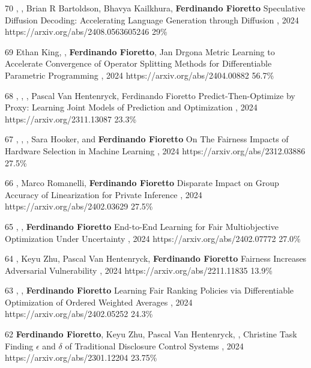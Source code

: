 \begin{pubs}
\confentry
	{70}
	{, , Brian R Bartoldson, Bhavya Kailkhura, {\bf Ferdinando Fioretto}}
	{Speculative Diffusion Decoding: Accelerating Language Generation through Diffusion}
	{, 2024}
	{https://arxiv.org/abs/2408.0563605246}
	{29\%}

\confentry
	{69}
	{Ethan King, , {\bf Ferdinando Fioretto}, Jan Drgona}
	{Metric Learning to Accelerate Convergence of Operator Splitting Methods for Differentiable Parametric Programming}
	{, 2024}
	{https://arxiv.org/abs/2404.00882}
	{56.7\%}

\confentry
	{68}
	{, , , Pascal Van Hentenryck, Ferdinando Fioretto}
	{Predict-Then-Optimize by Proxy: Learning Joint Models of Prediction and Optimization}
  	{\procECAI, 2024}
  	{https://arxiv.org/2311.13087}
  	{23.3\%} %

\confentry
	{67}
	{, , , Sara Hooker, and {\bf Ferdinando Fioretto}}
	{On The Fairness Impacts of Hardware Selection in Machine Learning}	
	{\procICML, 2024}
	{https://arxiv.org/abs/2312.03886}
	{27.5\%}

\confentry
	{66}
	{, Marco Romanelli, {\bf Ferdinando Fioretto}}
	{Disparate Impact on Group Accuracy of Linearization for Private Inference}
	{\procICML, 2024}
	{https://arxiv.org/abs/2402.03629}
	{27.5\%}

\confentry
	{65}
	{, , {\bf Ferdinando Fioretto}}
	{End-to-End Learning for Fair Multiobjective Optimization Under Uncertainty}
	{\procUAI, 2024}
	{https://arxiv.org/abs/2402.07772}
	{27.0\%}

\confentry
	{64}%
	{, Keyu Zhu, Pascal Van Hentenryck, {\bf Ferdinando Fioretto}}
	{Fairness Increases Adversarial Vulnerability}
	{\procIJCAI, 2024}
	{https://arxiv.org/abs/2211.11835}
	{13.9\%}

\confentry
	{63}
	{, , {\bf Ferdinando Fioretto}}
	{Learning Fair Ranking Policies via Differentiable Optimization of Ordered Weighted Averages}
	{\procFAccT, 2024}
	{https://arxiv.org/abs/2402.05252}
	{24.3\%}

\confentry
	{62}
	{{\bf Ferdinando Fioretto}, Keyu Zhu, Pascal Van Hentenryck, , Christine Task}
  	{Finding $\epsilon$ and $\delta$ of Traditional Disclosure Control Systems}
	{\procAAAI, 2024}
	{https://arxiv.org/abs/2301.12204}
	{23.75\%}


\end{pubs}
